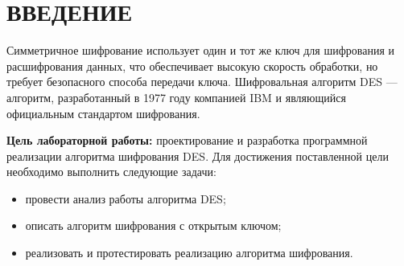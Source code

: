 \chapter*{ВВЕДЕНИЕ}

Симметричное шифрование использует один и тот же ключ для шифрования и расшифрования данных, что обеспечивает высокую скорость обработки, но требует безопасного способа передачи ключа. Шифровальная алгоритм DES --- алгоритм, разработанный в 1977 году компанией IBM и являющийся официальным стандартом шифрования.

\textbf{Цель лабораторной работы:} проектирование и разработка программной реализации алгоритма шифрования DES. Для достижения поставленной цели необходимо выполнить следующие задачи:

\begin{itemize}[label=---]
	\item провести анализ работы алгоритма DES;
	\item описать алгоритм шифрования с открытым ключом;
    \item реализовать и протестировать реализацию алгоритма шифрования.
\end{itemize}
